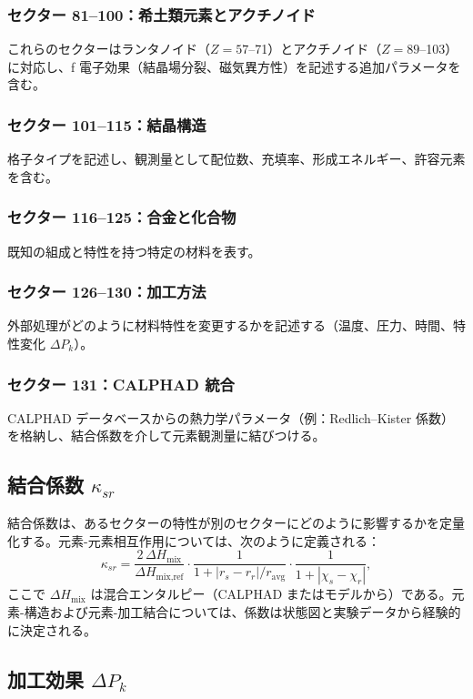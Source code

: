 \documentclass[11pt,a4paper]{article}
\theoremstyle{remark}
\begin{document}
	\subsubsection{セクター 81–100：希土類元素とアクチノイド}
	これらのセクターはランタノイド（\(Z=57\)–71）とアクチノイド（\(Z=89\)–103）に対応し、f 電子効果（結晶場分裂、磁気異方性）を記述する追加パラメータを含む。
	
	\subsubsection{セクター 101–115：結晶構造}
	格子タイプを記述し、観測量として配位数、充填率、形成エネルギー、許容元素を含む。
	
	\subsubsection{セクター 116–125：合金と化合物}
	既知の組成と特性を持つ特定の材料を表す。
	
	\subsubsection{セクター 126–130：加工方法}
	外部処理がどのように材料特性を変更するかを記述する（温度、圧力、時間、特性変化 \(\Delta P_k\)）。
	
	\subsubsection{セクター 131：CALPHAD 統合}
	CALPHAD データベースからの熱力学パラメータ（例：Redlich–Kister 係数）を格納し、結合係数を介して元素観測量に結びつける。
	
	\subsection{結合係数 \(\kappa_{sr}\)}
	
	結合係数は、あるセクターの特性が別のセクターにどのように影響するかを定量化する。元素-元素相互作用については、次のように定義される：
	\[
	\kappa_{sr} = \frac{2\,\Delta H_{\text{mix}}}{\Delta H_{\text{mix,ref}}} \cdot
	\frac{1}{1 + |r_s - r_r|/r_{\text{avg}}} \cdot
	\frac{1}{1 + |\chi_s - \chi_r|},
	\]
	ここで \(\Delta H_{\text{mix}}\) は混合エンタルピー（CALPHAD またはモデルから）である。元素-構造および元素-加工結合については、係数は状態図と実験データから経験的に決定される。
	
	\subsection{加工効果 \(\Delta P_k\)}
	\label{sec:processing}
	
\end{document}
